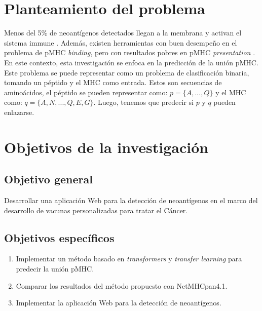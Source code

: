 \documentclass[a4paper]{article}
\begin{document}
\section{Planteamiento del problema}

Menos del 5\% de neoantígenos detectados llegan a la membrana y activan el sistema immune \citep{de2020neoantigen, mill2022neoms, bulik2019deep, bassani2015mass, yadav2014predicting}. Además, existen herramientas con buen desempeño en el problema de pMHC \textit{binding}, pero con resultados pobres en  pMHC \textit{presentation} \citep{bulik2019deep}. En este contexto, esta investigación se enfoca en la predicción de la unión pMHC. Este problema se puede representar como un problema de clasificación binaria, tomando un péptido y el MHC como entrada. Estos son secuencias de aminoácidos, el péptido se pueden representar como: $p = \{ A, ... , Q \}$ y el MHC como: $q = \{ A, N, ... ,Q, E, G \}$. Luego, tenemos que  predecir si $p$ y $q$ pueden enlazarse. %



	
\section{Objetivos de la investigación}
	
	\subsection{Objetivo general}
	
	Desarrollar una aplicación Web para la detección de neoantígenos en el marco del desarrollo de vacunas personalizadas para tratar el Cáncer.
	
	\subsection{Objetivos específicos}
	\begin{enumerate}
		\item Implementar un método basado en \textit{transformers} y \textit{transfer learning} para predecir la unión pMHC.	
		\item Comparar los resultados del método propuesto con NetMHCpan4.1.
		\item Implementar la aplicación Web para la detección de neoantígenos.
	

		

		
	\end{enumerate}
\end{document}
